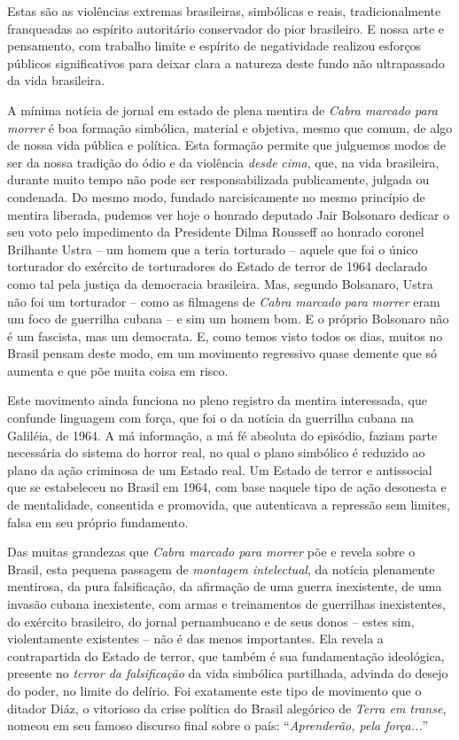 Estas são as violências extremas brasileiras, simbólicas e reais,
tradicionalmente franqueadas ao espírito autoritário conservador do pior
brasileiro. E nossa arte e pensamento, com trabalho limite e espírito de
negatividade realizou esforços públicos significativos para deixar clara
a natureza deste fundo não ultrapassado da vida brasileira.

A mínima notícia de jornal em estado de plena mentira de \emph{Cabra
marcado para morrer} é boa formação simbólica, material e objetiva,
mesmo que comum, de algo de nossa vida pública e política. Esta formação
permite que julguemos modos de ser da nossa tradição do ódio e da
violência \emph{desde} \emph{cima}, que, na vida brasileira, durante
muito tempo não pode ser responsabilizada publicamente, julgada ou
condenada. Do mesmo modo, fundado narcisicamente no mesmo princípio de
mentira liberada, pudemos ver hoje o honrado deputado Jair Bolsonaro
dedicar o seu voto pelo impedimento da Presidente Dilma Rousseff ao
honrado coronel Brilhante Ustra -- um homem que a teria torturado --
aquele que foi o único torturador do exército de torturadores do Estado
de terror de 1964 declarado como tal pela justiça da democracia
brasileira. Mas, segundo Bolsanaro, Ustra não foi um torturador -- como
as filmagens de \emph{Cabra} \emph{marcado} \emph{para} \emph{morrer}
eram um foco de guerrilha cubana -- e sim um homem bom. E o próprio
Bolsonaro não é um fascista, mas um democrata. E, como temos visto todos
os dias, muitos no Brasil pensam deste modo, em um movimento regressivo
quase demente que só aumenta e que põe muita coisa em risco.

Este movimento ainda funciona no pleno registro da mentira interessada,
que confunde linguagem com força, que foi o da notícia da guerrilha
cubana na Galiléia, de 1964. A má informação, a má fé absoluta do
episódio, faziam parte necessária do sistema do horror real, no qual o
plano simbólico é reduzido ao plano da ação criminosa de um Estado real.
Um Estado de terror e antissocial que se estabeleceu no Brasil em 1964,
com base naquele tipo de ação desonesta e de mentalidade, consentida e
promovida, que autenticava a repressão sem limites, falsa em seu próprio
fundamento.

Das muitas grandezas que \emph{Cabra marcado para morrer} põe e revela
sobre o Brasil, esta pequena passagem de \emph{montagem intelectual}, da
notícia plenamente mentirosa, da pura falsificação, da afirmação de uma
guerra inexistente, de uma invasão cubana inexistente, com armas e
treinamentos de guerrilhas inexistentes, do exército brasileiro, do
jornal pernambucano e de seus donos -- estes sim, violentamente
existentes -- não é das menos importantes. Ela revela a contrapartida do
Estado de terror, que também é sua fundamentação ideológica, presente no
\emph{terror da falsificação} da vida simbólica partilhada, advinda do
desejo do poder, no limite do delírio. Foi exatamente este tipo de
movimento que o ditador Diáz, o vitorioso da crise política do Brasil
alegórico de \emph{Terra em transe}, nomeou em seu famoso discurso final
sobre o país: ``\emph{Aprenderão, pela força...}''

